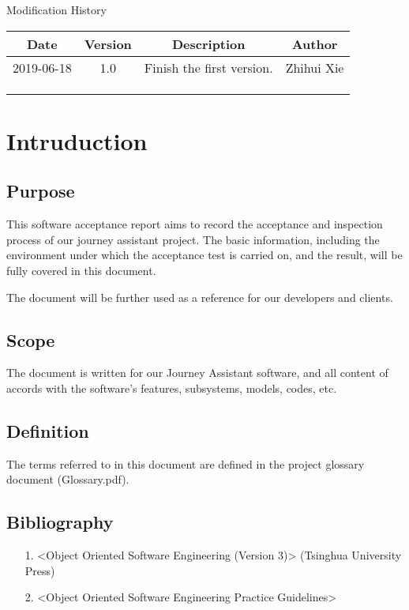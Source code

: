 \documentclass[10pt]{article}
\begin{document}
\newpage

\begin{center}
    {\LARGE Modification History}
    
    \begin{tabular}{|c|c|c|c|} 
        \hline 
        Date&Version&Description&Author\\
        \hline  
        2019-06-18&1.0&Finish the first version.&Zhihui Xie\\
		\hline 
		& & & \\
		\hline
		& & & \\
		\hline
		& & & \\
		\hline
    \end{tabular}    
\end{center}

\newpage

\tableofcontents
\newpage

\section{Intruduction}
\subsection{Purpose}
This software acceptance report aims to record the acceptance and inspection process of our journey assistant project. The basic information, including the environment under which the acceptance test is carried on, and the result, will be fully covered in this document.

The document will be further used as a reference for our developers and clients.

\subsection{Scope}
The document is written for our Journey Assistant software, and all content of accords with the software's features, subsystems, models, codes, etc.

\subsection{Definition}
The terms referred to in this document are defined in the project glossary document (Glossary.pdf).

\subsection{Bibliography}
\begin{itemize}
	\item[1.] <Object Oriented Software Engineering (Version 3)> (Tsinghua University Press)
	\item[2.] <Object Oriented Software Engineering Practice Guidelines> 
\end{itemize}
\end{document}
